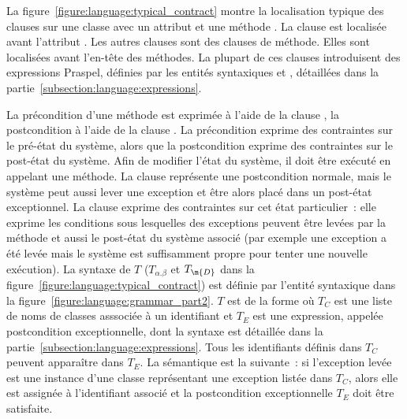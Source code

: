 La figure~\ref{figure:language:typical_contract} montre la localisation typique
des clauses sur une classe  avec un attribut  et une méthode
. La clause \ainvariant est localisée avant l'attribut .  Les
autres clauses sont des clauses de méthode. Elles sont localisées avant
l'en-tête des méthodes. La plupart de ces clauses introduisent des expressions
Praspel, définies par les entités syntaxiques  et
, détaillées dans la
partie~\ref{subsection:language:expressions}.

La précondition d'une méthode est exprimée à l'aide de la clause \arequires, la
postcondition à l'aide de la clause \aensures. La précondition exprime des
contraintes sur le {\strong pré-état} du système, alors que la postcondition
exprime des contraintes sur le {\strong post-état} du système. Afin de modifier
l'état du système, il doit être exécuté en appelant une méthode. La clause
\aensures représente une {\strong postcondition normale}, mais le système peut
aussi lever une exception et être alors placé dans un {\strong post-état
exceptionnel}. La clause \athrowable exprime des contraintes sur cet état
particulier~: elle exprime les conditions sous lesquelles des exceptions peuvent
être levées par la méthode et aussi le post-état du système associé (par exemple
une exception a été levée mais le système est suffisamment propre pour tenter
une nouvelle exécution). La syntaxe de $T$ ($T_{\alpha.\beta}$ et $T_\m{D}$ dans
la figure~\ref{figure:language:typical_contract}) est définie par l'entité
syntaxique  dans la
figure~\ref{figure:language:grammar_part2}. $T$ est de la forme  où $T_C$ est une liste de noms de classes asssociée à un identifiant et
$T_E$ est une expression, appelée {\strong postcondition exceptionnelle}, dont
la syntaxe est détaillée dans la partie~\ref{subsection:language:expressions}.
Tous les identifiants définis dans $T_C$ peuvent apparaître dans $T_E$. La
sémantique est la suivante~: si l'exception levée est une instance d'une classe
représentant une exception listée dans $T_C$, alors elle est assignée à
l'identifiant associé et la postcondition exceptionnelle $T_E$ doit être
satisfaite.


